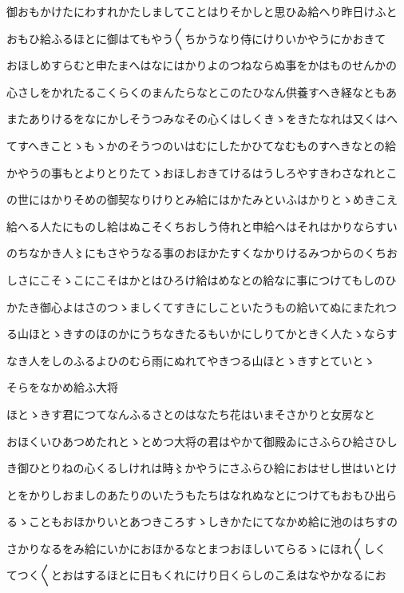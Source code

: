 \documentclass[a4paper,11pt,landscape]{ltjtarticle}
\begin{document}
御おもかけたにわすれかたしましてことはりそかしと思ひゐ給へり昨日けふと
\par\medskip
おもひ給ふるほとに御はてもやう〱ちかうなり侍にけりいかやうにかおきて
\par\medskip
おほしめすらむと申たまへはなにはかりよのつねならぬ事をかはものせんかの
\par\medskip
心さしをかれたるこくらくのまんたらなとこのたひなん供養すへき経なともあ
\par\medskip
またありけるをなにかしそうつみなその心くはしくきゝをきたなれは又くはへ
\par\medskip
てすへきことゝもゝかのそうつのいはむにしたかひてなむものすへきなとの給
\par\medskip
かやうの事もとよりとりたてゝおほしおきてけるはうしろやすきわさなれとこ
\par\medskip
の世にはかりそめの御契なりけりとみ給にはかたみといふはかりとゝめきこえ
\par\medskip
給へる人たにものし給はぬこそくちおしう侍れと申給へはそれはかりならすい
\par\medskip
のちなかき人〻にもさやうなる事のおほかたすくなかりけるみつからのくちお
\par\medskip
しさにこそゝこにこそはかとはひろけ給はめなとの給なに事につけてもしのひ
\par\medskip
かたき御心よはさのつゝましくてすきにしこといたうもの給いてぬにまたれつ
\par\medskip
る山ほとゝきすのほのかにうちなきたるもいかにしりてかときく人たゝならす
\par\medskip
なき人をしのふるよひのむら雨にぬれてやきつる山ほとゝきすとていとゝ
\par\medskip
そらをなかめ給ふ大将
\par\medskip
ほとゝきす君につてなんふるさとのはなたち花はいまそさかりと女房なと
\par\medskip
おほくいひあつめたれとゝとめつ大将の君はやかて御殿ゐにさふらひ給さひし
\par\medskip
き御ひとりねの心くるしけれは時〻かやうにさふらひ給におはせし世はいとけ
\par\medskip
とをかりしおましのあたりのいたうもたちはなれぬなとにつけてもおもひ出ら
\par\medskip
るゝこともおほかりいとあつきころすゝしきかたにてなかめ給に池のはちすの
\par\medskip
さかりなるをみ給にいかにおほかるなとまつおほしいてらるゝにほれ〱しく
\par\medskip
てつく〱とおはするほとに日もくれにけり日くらしのこゑはなやかなるにお
\end{document}
